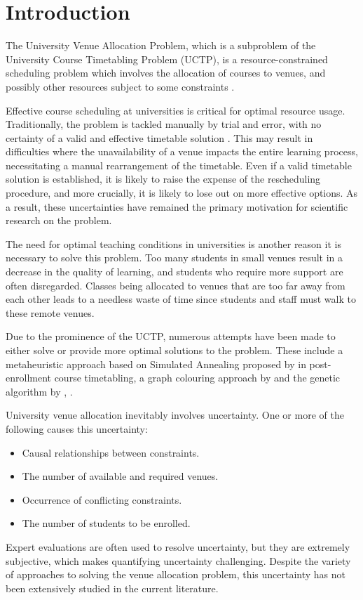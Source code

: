 \documentclass[conference]{IEEEtran}
\begin{document}
\section{Introduction}
The University Venue Allocation Problem, which is a subproblem of the University Course Timetabling Problem (UCTP), is a resource-constrained scheduling problem which involves the allocation of courses to venues, and possibly other resources subject to some constraints \cite{chen2020tabu}.

Effective course scheduling at universities is critical for optimal resource usage. Traditionally, the problem is tackled manually by trial and error, with no certainty of a valid and effective timetable solution \cite{basir2013simulated}. This may result in difficulties where the unavailability of a venue impacts the entire learning process, necessitating a manual rearrangement of the timetable. Even if a valid timetable solution is established, it is likely to raise the expense of the rescheduling procedure, and more crucially, it is likely to lose out on more effective options. As a result, these uncertainties have remained the primary motivation for scientific research on the problem.

The need for optimal teaching conditions in universities is another reason it is necessary to solve this problem. Too many students in small venues result in a decrease in the quality of learning, and students who require more support are often disregarded. Classes being allocated to venues that are too far away from each other leads to a needless waste of time since students and staff must walk to these remote venues.

Due to the prominence of the UCTP, numerous attempts have been made to either solve or provide more optimal solutions to the problem. These include a metaheuristic approach based on Simulated Annealing proposed by \cite{ceschia2012design} in post-enrollment course timetabling, a graph colouring approach by \cite{soni} and the genetic algorithm by \cite{lol}, \cite{ahmad}. 

University venue allocation inevitably involves uncertainty. One or more of the following causes this uncertainty: 
\begin{itemize}
\item Causal relationships between constraints.
\item The number of available and required venues.
\item Occurrence of conflicting constraints.
\item The number of students to be enrolled.
\end{itemize}
Expert evaluations are often used to resolve uncertainty, but they are extremely subjective, which makes quantifying uncertainty challenging. Despite the variety of approaches to solving the venue allocation problem, this uncertainty has not been extensively studied in the current literature.
\end{document}
